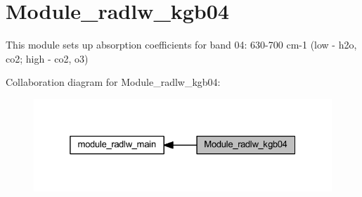 \hypertarget{group__module__radlw__kgb04}{}\section{Module\+\_\+radlw\+\_\+kgb04}
\label{group__module__radlw__kgb04}


This module sets up absorption coefficients for band 04\+: 630-\/700 cm-\/1 (low -\/ h2o, co2; high -\/ co2, o3)  


Collaboration diagram for Module\+\_\+radlw\+\_\+kgb04\+:\nopagebreak
\begin{figure}[H]
\begin{center}
\leavevmode
\includegraphics[width=325pt]{group__module__radlw__kgb04}
\end{center}
\end{figure}
